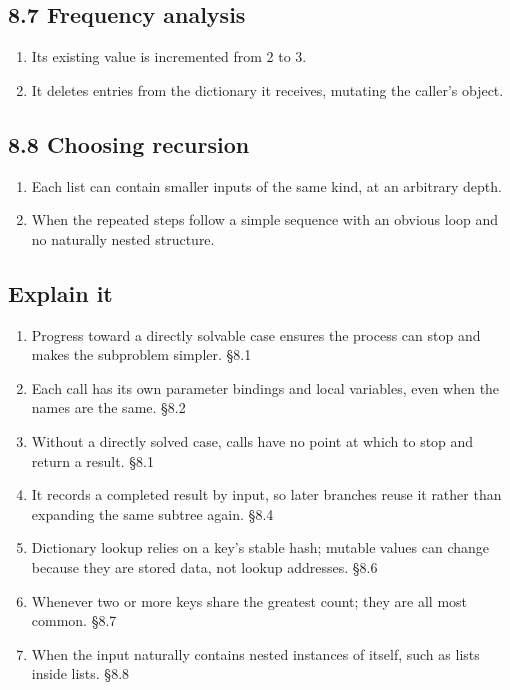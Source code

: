 \documentclass[11pt]{article}
\begin{document}
\begin{keepsection}\subsection{8.7 Frequency analysis}

\begin{enumerate}
\item Its existing value is incremented from 2 to 3.
\item It deletes entries from the dictionary it receives, mutating the caller’s object.
\end{enumerate}

\end{keepsection}
\begin{keepsection}\subsection{8.8 Choosing recursion}

\begin{enumerate}
\item Each list can contain smaller inputs of the same kind, at an arbitrary depth.
\item When the repeated steps follow a simple sequence with an obvious loop and no naturally nested structure.
\end{enumerate}

\end{keepsection}
\begin{keepsection}\subsection{Explain it}

\begin{enumerate}
\item Progress toward a directly solvable case ensures the process can stop and makes the subproblem simpler. \hfill{\small\color{FAUblue}§8.1}
\item Each call has its own parameter bindings and local variables, even when the names are the same. \hfill{\small\color{FAUblue}§8.2}
\item Without a directly solved case, calls have no point at which to stop and return a result. \hfill{\small\color{FAUblue}§8.1}
\item It records a completed result by input, so later branches reuse it rather than expanding the same subtree again. \hfill{\small\color{FAUblue}§8.4}
\item Dictionary lookup relies on a key’s stable hash; mutable values can change because they are stored data, not lookup addresses. \hfill{\small\color{FAUblue}§8.6}
\item Whenever two or more keys share the greatest count; they are all most common. \hfill{\small\color{FAUblue}§8.7}
\item When the input naturally contains nested instances of itself, such as lists inside lists. \hfill{\small\color{FAUblue}§8.8}
\end{enumerate}

\end{keepsection}
\end{document}
